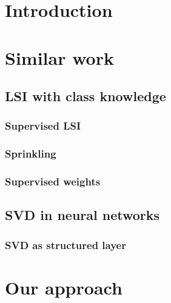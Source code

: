 \chapter*{Introduction}


{}


\chapter{Similar work}
    \section{LSI with class knowledge}
        \subsection{Supervised LSI}
            \cite{sun2004supervised} %

        \subsection{Sprinkling}
            \cite{chakraborti2007supervised} %
        
        \subsection{Supervised weights} \label{sec:supervised:weights}
            \cite{wu2017balancing} %
            \cite{ji2013discriminative} %
            \cite{deng2014study} %
            \cite{lan2009supervised} %

    
    \section{SVD in neural networks}
        \subsection{SVD as structured layer} 
            \cite{ionescu2015training} %

    
\chapter{Our approach}
    
